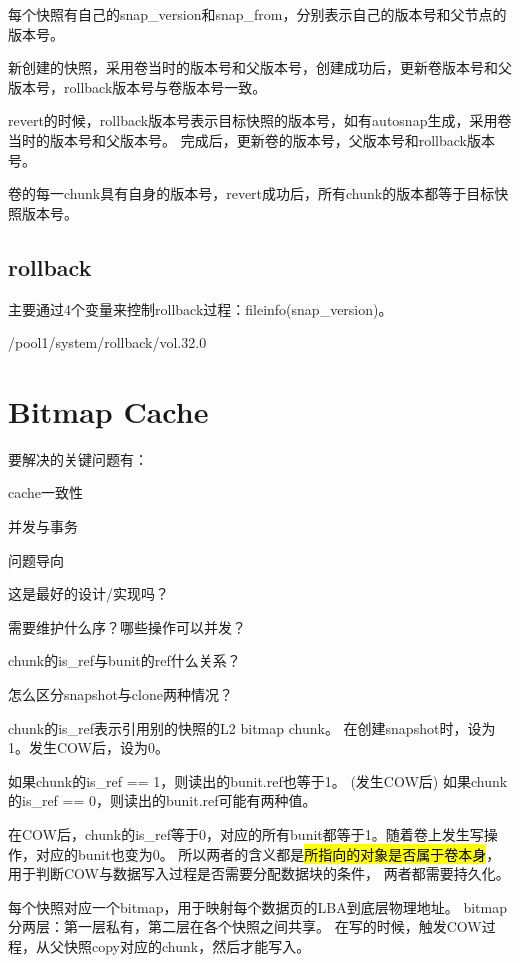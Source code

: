 每个快照有自己的snap\_version和snap\_from，分别表示自己的版本号和父节点的版本号。

新创建的快照，采用卷当时的版本号和父版本号，创建成功后，更新卷版本号和父版本号，rollback版本号与卷版本号一致。

revert的时候，rollback版本号表示目标快照的版本号，如有autosnap生成，采用卷当时的版本号和父版本号。
完成后，更新卷的版本号，父版本号和rollback版本号。

卷的每一chunk具有自身的版本号，revert成功后，所有chunk的版本都等于目标快照版本号。

\subsection{rollback}

主要通过4个变量来控制rollback过程：fileinfo(snap\_version)。

/pool1/system/rollback/vol.32.0

\section{Bitmap Cache}

要解决的关键问题有：
\begin{enumbox}
\item cache一致性
\item 并发与事务
\end{enumbox}

问题导向
\begin{enumbox}
\item 这是最好的设计/实现吗？
\item 需要维护什么序？哪些操作可以并发？
\item chunk的is\_ref与bunit的ref什么关系？
\item 怎么区分snapshot与clone两种情况？
\end{enumbox}

chunk的is\_ref表示引用别的快照的L2 bitmap chunk。
在创建snapshot时，设为1。发生COW后，设为0。

如果chunk的is\_ref == 1，则读出的bunit.ref也等于1。
(发生COW后)
如果chunk的is\_ref == 0，则读出的bunit.ref可能有两种值。

在COW后，chunk的is\_ref等于0，对应的所有bunit都等于1。随着卷上发生写操作，对应的bunit也变为0。
所以两者的含义都是\hl{所指向的对象是否属于卷本身}，用于判断COW与数据写入过程是否需要分配数据块的条件，
两者都需要持久化。

每个快照对应一个bitmap，用于映射每个数据页的LBA到底层物理地址。
bitmap分两层：第一层私有，第二层在各个快照之间共享。
在写的时候，触发COW过程，从父快照copy对应的chunk，然后才能写入。

